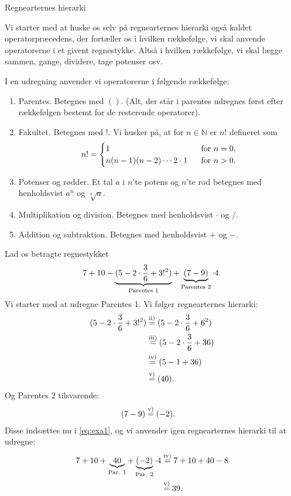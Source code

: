 
\begin{center}
\Huge
Regnearternes hierarki
\end{center}

Vi starter med at huske os selv på regnearternes hierarki også kaldet operatorpræcedens, der fortæller os i hvilken rækkefølge, vi skal anvende operatorerne i et givent regnestykke. Altså i hvilken rækkefølge, vi skal lægge sammen, gange, dividere, tage potenser osv. 
\begin{defn}
I en udregning anvender vi operatorerne i følgende rækkefølge:
\begin{enumerate}[label=\roman*)]
\item Parentes. Betegnes med $()$. (Alt, der står i parentes udregnes først efter rækkefølgen bestemt for de resterende operatorer).
\item Fakultet. Betegnes med $!$. Vi husker på, at for $n\in \mathbb{N}$ er $n!$ defineret som 
\begin{align*}
n! = \begin{cases}
1 \ &\textnormal{ for }n=0,\\
n(n-1)(n-2)\cdots 2\cdot 1 \ &\textnormal{ for }n>0.
\end{cases}
\end{align*}
\item Potenser og rødder. Et tal $a$ i $n$'te potens og $n$'te rod betegnes med henholdsvist $a^n$ og $\sqrt[n]{a}$.
\item Multiplikation og division. Betegnes med henholdsvist $\cdot$ og $/$.
\item Addition og subtraktion. Betegnes med henholdsvist $+$ og $-$.
\end{enumerate}
\end{defn} 
\begin{exa}
Lad os betragte regnestykket
\begin{align}\label{eq:exa1}
7+10-\underbrace{(5-2\cdot \frac{3}{6}+3!^2)}_{\textnormal{Parentes 1}}+\underbrace{(7-9)}_{\textnormal{Parentes 2}}\cdot 4.
\end{align}
Vi starter med at udregne Parentes 1. Vi følger regnearternes hierarki:
\begin{align*}
(5-2\cdot \frac{3}{6}+3!^2) &\overset{\textnormal{ii)}}{=} (5-2\cdot \frac{3}{6}+6^2)\\
							&\overset{\textnormal{iii)}}{=} (5-2\cdot \frac{3}{6}+36)\\
							&\overset{\textnormal{iv)}}{=} (5-1+36)\\
							&\overset{\textnormal{v)}}{=} (40).
\end{align*}
Og Parentes 2 tilsvarende:
\begin{align*}
(7-9) &\overset{\textnormal{v)}}{=} (-2).
\end{align*}
Disse indsættes nu i \eqref{eq:exa1}, og vi anvender igen regnearternes hierarki til at udregne:
\begin{align*}
7+10+\underbrace{40}_{\textnormal{Par. 1}} + \underbrace{(-2)}_{\textnormal{Par. 2}}\cdot 4 &\overset{\textnormal{iv)}}{=} 7+10+40 -8 \\
&\overset{\textnormal{v)}}{=} 39.
\end{align*}
\end{exa}
